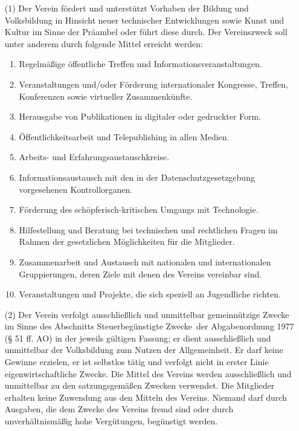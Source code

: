 \documentclass[12pt,paper=a4,ngerman]{scrreprt}
\begin{document}
\begin{itemize}
\item[(1)]
Der Verein fördert und unterstützt Vorhaben der Bildung und
Volksbildung in Hinsicht neuer technischer Entwicklungen sowie Kunst
und Kultur im Sinne der Präambel oder führt diese durch. Der
Vereinszweck soll unter anderem durch folgende Mittel erreicht
werden:
\begin{enumerate}
\item
Regelmäßige öffentliche Treffen und Informationsveranstaltungen.
\item
Veranstaltungen und/oder Förderung internationaler Kongresse, Treffen,
Konferenzen sowie virtueller Zusammenkünfte.
\item
Herausgabe von Publikationen in digitaler oder gedruckter Form.
\item
Öffentlichkeitsarbeit und Telepublishing in allen Medien.
\item
Arbeits- und Erfahrungsaustauschkreise.
\item
Informationsaustausch mit den in der Datenschutzgesetzgebung
vorgesehenen Kontrollorganen.
\item
Förderung des schöpferisch-kritischen Umgangs mit Technologie.
\item
Hilfestellung und Beratung bei technischen und rechtlichen Fragen im
Rahmen der gesetzlichen Möglichkeiten für die Mitglieder.
\item
Zusammenarbeit und Austausch mit nationalen und internationalen
Gruppierungen, deren Ziele mit denen des Vereins vereinbar sind.
\item
Veranstaltungen und Projekte, die sich speziell an Jugendliche richten.
\end{enumerate}
\item[(2)]
Der Verein verfolgt ausschließlich und unmittelbar gemeinnützige
Zwecke im Sinne des Abschnitts \glqq Steuerbegünstigte Zwecke\grqq\
der Abgabenordnung 1977 (§ 51 ff. AO) in der jeweils gültigen
Fassung; er dient ausschließlich und unmittelbar der Volksbildung zum
Nutzen der Allgemeinheit. Er darf keine Gewinne erzielen, er ist
selbstlos tätig und verfolgt nicht in erster Linie
eigenwirtschaftliche Zwecke. Die Mittel des Vereins werden
ausschließlich und unmittelbar zu den satzungsgemäßen Zwecken
verwendet. Die Mitglieder erhalten keine Zuwendung aus den Mitteln des
Vereins. Niemand darf durch Ausgaben, die dem Zwecke des Vereins fremd
sind oder durch unverhältnismäßig hohe Vergütungen, begünstigt werden.
\end{itemize}
\end{document}
